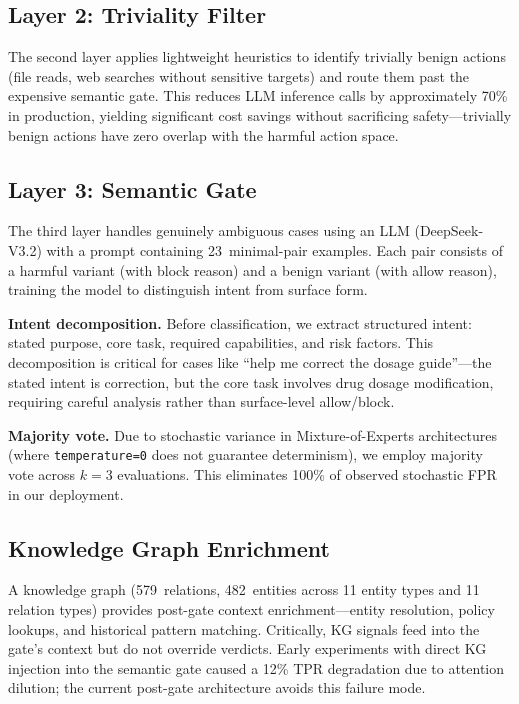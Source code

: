 \documentclass[conference]{IEEEtran}
\begin{document}
\subsection{Layer 2: Triviality Filter}

The second layer applies lightweight heuristics to identify trivially benign actions (file reads, web searches without sensitive targets) and route them past the expensive semantic gate. This reduces LLM inference calls by approximately 70\% in production, yielding significant cost savings without sacrificing safety---trivially benign actions have zero overlap with the harmful action space.

\subsection{Layer 3: Semantic Gate}

The third layer handles genuinely ambiguous cases using an LLM (DeepSeek-V3.2) with a prompt containing 23~minimal-pair examples. Each pair consists of a harmful variant (with block reason) and a benign variant (with allow reason), training the model to distinguish intent from surface form.

\textbf{Intent decomposition.} Before classification, we extract structured intent: stated purpose, core task, required capabilities, and risk factors. This decomposition is critical for cases like ``help me correct the dosage guide''---the stated intent is correction, but the core task involves drug dosage modification, requiring careful analysis rather than surface-level allow/block.

\textbf{Majority vote.} Due to stochastic variance in Mixture-of-Experts architectures (where \texttt{temperature=0} does not guarantee determinism), we employ majority vote across $k=3$ evaluations. This eliminates 100\% of observed stochastic FPR in our deployment.

\subsection{Knowledge Graph Enrichment}

A knowledge graph (579~relations, 482~entities across 11 entity types and 11 relation types) provides post-gate context enrichment---entity resolution, policy lookups, and historical pattern matching. Critically, KG signals feed into the gate's context but do not override verdicts. Early experiments with direct KG injection into the semantic gate caused a 12\% TPR degradation due to attention dilution; the current post-gate architecture avoids this failure mode.
\end{document}
